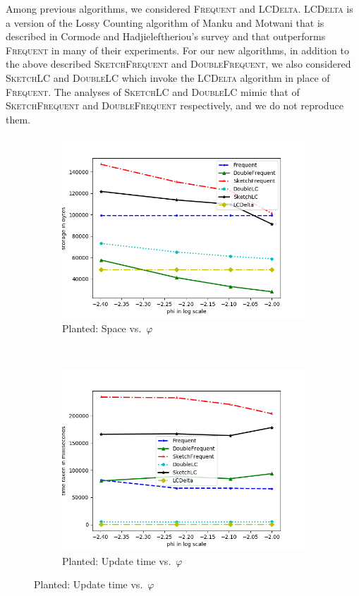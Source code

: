 \documentclass[sigconf,review=true,anonymous=true,screen]{acmart}
\renewcommand{\phi}{\varphi}
\begin{document}
Among previous algorithms, we considered \textsc{Frequent} and \textsc{LCDelta}. \textsc{LCDelta} is a version of the Lossy Counting algorithm of Manku and Motwani \cite{MM02} that is
described in Cormode and Hadjieleftheriou's survey \cite{FrequentSurvey} and that outperforms \textsc{Frequent} in many of their experiments. 
For our new algorithms, in addition to the above described \textsc{SketchFrequent} and \textsc{DoubleFrequent}, we also considered \textsc{SketchLC} and \textsc{DoubleLC}
which invoke the \textsc{LCDelta} algorithm in place of \textsc{Frequent}. The analyses of \textsc{SketchLC} and \textsc{DoubleLC} mimic that of \textsc{SketchFrequent} and \textsc{DoubleFrequent}
respectively, and we do not reproduce them.
\begin{figure}[!t]
\centering
\begin{subfigure}[b]{0.33\textwidth}
\includegraphics[width=\textwidth]{../Plots/storage_phi.png}
\caption{Planted: Space vs.~$\phi$}
\label{fig:plspphi}
\end{subfigure}
~
\begin{subfigure}[b]{0.33\textwidth}
\includegraphics[width=\textwidth]{../Plots/time_phi.png}
\caption{Planted: Update time vs.~$\phi$}
\label{fig:pltimphi}
\end{subfigure}


\end{figure}
\end{document}
